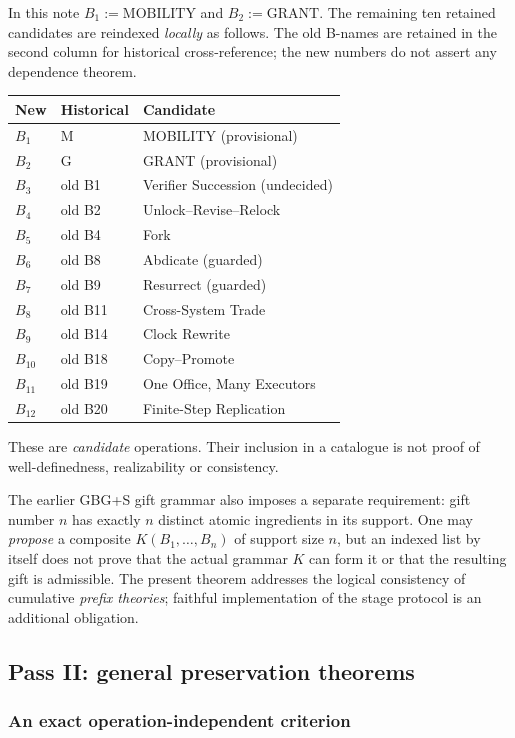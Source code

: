 \documentclass[11pt,letterpaper]{article}
\theoremstyle{definition}\newtheorem{definition}[theorem]{Definition}\newtheorem{example}[theorem]{Example}
\theoremstyle{remark}\newtheorem{remark}[theorem]{Remark}
\begin{document}
In this note \(B_1:=\mathrm{MOBILITY}\) and \(B_2:=\mathrm{GRANT}\). The remaining ten retained candidates are reindexed \emph{locally} as follows. The old B-names are retained in the second column for historical cross-reference; the new numbers do not assert any dependence theorem.
\begin{center}
\small
\begin{tabular}{@{}>{\bfseries}l l p{3.55in}@{}}
\toprule
New & Historical & Candidate \\
\midrule
\(B_1\) & M & MOBILITY (provisional) \\
\(B_2\) & G & GRANT (provisional) \\
\(B_3\) & old B1 & Verifier Succession (undecided) \\
\(B_4\) & old B2 & Unlock--Revise--Relock \\
\(B_5\) & old B4 & Fork \\
\(B_6\) & old B8 & Abdicate (guarded) \\
\(B_7\) & old B9 & Resurrect (guarded) \\
\(B_8\) & old B11 & Cross-System Trade \\
\(B_9\) & old B14 & Clock Rewrite \\
\(B_{10}\) & old B18 & Copy--Promote \\
\(B_{11}\) & old B19 & One Office, Many Executors \\
\(B_{12}\) & old B20 & Finite-Step Replication \\
\bottomrule
\end{tabular}
\end{center}
These are \emph{candidate} operations. Their inclusion in a catalogue is not proof of well-definedness, realizability or consistency.

The earlier GBG+S gift grammar also imposes a separate requirement: gift number \(n\) has exactly \(n\) distinct atomic ingredients in its support. One may \emph{propose} a composite \(K(B_1,\dots,B_n)\) of support size \(n\), but an indexed list by itself does not prove that the actual grammar \(K\) can form it or that the resulting gift is admissible. The present theorem addresses the logical consistency of cumulative \emph{prefix theories}; faithful implementation of the stage protocol is an additional obligation.

\subsection{Pass II: general preservation theorems}
\subsubsection{An exact operation-independent criterion}
\end{document}
